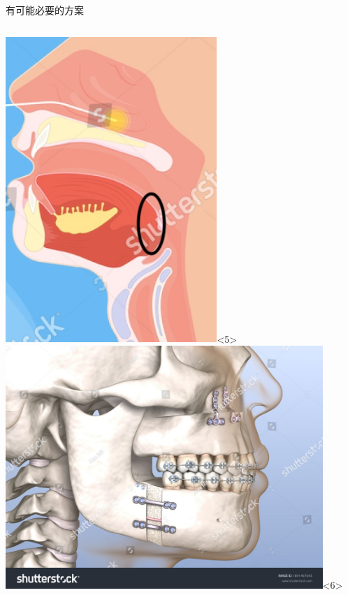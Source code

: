 \documentclass[aspectratio=169]{beamer}
\begin{document}
\begin{frame}{有可能必要的方案}
\begin{columns}
    \includegraphics[width=0.6\textwidth]{tongue_base.jpg}<5>
    \includegraphics[width=0.9\textwidth]{stock-photo-maxillomandibular-advancement-surgery-medically-accurate-dental-d-illustration-1891467643.jpg}<6>
    \end{columns}
\end{frame}
\end{document}
